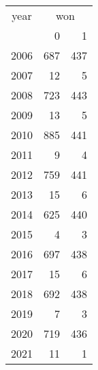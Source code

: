 \footnotesize\begin{tabular}[t]{lrr}
\toprule
\multicolumn{1}{c}{year} & \multicolumn{2}{c}{won} \\
\cmidrule(l{3pt}r{3pt}){1-1} \cmidrule(l{3pt}r{3pt}){2-3}
  & 0 & 1\\
\midrule
2006 & 687 & 437\\
2007 & 12 & 5\\
2008 & 723 & 443\\
2009 & 13 & 5\\
2010 & 885 & 441\\
2011 & 9 & 4\\
2012 & 759 & 441\\
2013 & 15 & 6\\
2014 & 625 & 440\\
2015 & 4 & 3\\
2016 & 697 & 438\\
2017 & 15 & 6\\
2018 & 692 & 438\\
2019 & 7 & 3\\
2020 & 719 & 436\\
2021 & 11 & 1\\
\bottomrule
\end{tabular}
